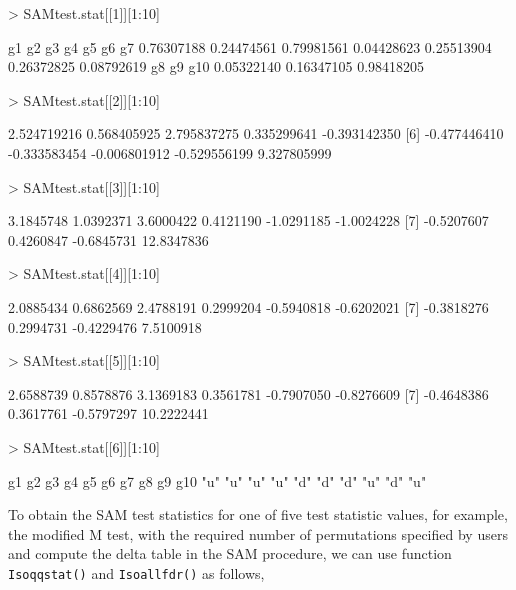 \documentclass[10pt]{article}
\begin{document}
\begin{Schunk}
\begin{Sinput}
> SAMtest.stat[[1]][1:10]
\end{Sinput}
\begin{Soutput}
        g1         g2         g3         g4         g5         g6         g7 
0.76307188 0.24474561 0.79981561 0.04428623 0.25513904 0.26372825 0.08792619 
        g8         g9        g10 
0.05322140 0.16347105 0.98418205 
\end{Soutput}
\begin{Sinput}
> SAMtest.stat[[2]][1:10]
\end{Sinput}
\begin{Soutput}
 [1]  2.524719216  0.568405925  2.795837275  0.335299641 -0.393142350
 [6] -0.477446410 -0.333583454 -0.006801912 -0.529556199  9.327805999
\end{Soutput}
\begin{Sinput}
> SAMtest.stat[[3]][1:10]
\end{Sinput}
\begin{Soutput}
 [1]  3.1845748  1.0392371  3.6000422  0.4121190 -1.0291185 -1.0024228
 [7] -0.5207607  0.4260847 -0.6845731 12.8347836
\end{Soutput}
\begin{Sinput}
> SAMtest.stat[[4]][1:10]
\end{Sinput}
\begin{Soutput}
 [1]  2.0885434  0.6862569  2.4788191  0.2999204 -0.5940818 -0.6202021
 [7] -0.3818276  0.2994731 -0.4229476  7.5100918
\end{Soutput}
\begin{Sinput}
> SAMtest.stat[[5]][1:10]
\end{Sinput}
\begin{Soutput}
 [1]  2.6588739  0.8578876  3.1369183  0.3561781 -0.7907050 -0.8276609
 [7] -0.4648386  0.3617761 -0.5797297 10.2222441
\end{Soutput}
\begin{Sinput}
> SAMtest.stat[[6]][1:10]
\end{Sinput}
\begin{Soutput}
 g1  g2  g3  g4  g5  g6  g7  g8  g9 g10 
"u" "u" "u" "u" "d" "d" "d" "u" "d" "u" 
\end{Soutput}
\end{Schunk}


To obtain the SAM test statistics for one of five test statistic values, for example, the modified M test,
with the required number of permutations specified by users and compute the
delta table in the SAM procedure, we can use function \texttt{Isoqqstat()} and \texttt{Isoallfdr()} as follows,
\end{document}
